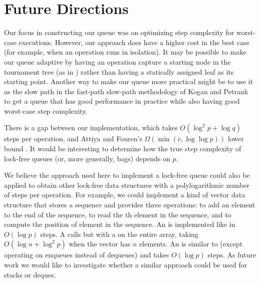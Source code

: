 
\section{Future Directions}

Our focus in constructing our queue was on optimizing step complexity for worst-case executions.
However, our approach does have a higher cost in the best case (for example, when an operation
runs in isolation).
It may be possible to make our queue adaptive by having an operation capture a starting node
in the tournament tree (as in \cite{??}) rather than having a statically assigned leaf as its starting point.
Another way to make our queue more practical might be to use it as the slow path in the
fast-path slow-path methodology of Kogan and Petrank \cite{10.1145/2370036.2145835} to
get a queue that has good performance in practice while also having good worst-case step complexity.

There is a gap between our implementation, which takes $O(\log^2 p + \log q)$ steps per operation,
and Attiya and Fouren's $\Omega(\min(c,\log\log p))$ lower bound \cite{DBLP:conf/opodis/AttiyaF17}.
It would be interesting to determine how the true step complexity of lock-free queues (or, more generally, bags)
depends on $p$.

We believe the approach used here to implement a lock-free queue 
could also be applied to obtain other lock-free
data structures with a polylogarithmic number of steps per operation.
For example, we could implement a kind of vector data structure that stores a sequence and
provides three operations:  to add an element  to the end of the sequence,
 to read the th element in the sequence, and
 to compute the position of element  in the sequence.
An  is implemented like  in $O(\log p)$ steps.  
A  calls  but with a  on the entire  array, taking $O(\log n + \log^2p)$ when the vector has $n$ elements.  
An  is similar to  (except operating on enqueues instead of dequeues) and takes $O(\log p)$ steps.
As future work we would like to investigate whether a similar approach could be used for stacks or deques.

